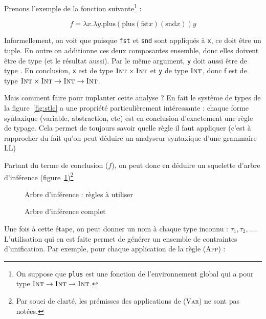 Prenons l'exemple de la fonction suivante\footnote{ On suppose que \texttt{plus}
est une fonction de l'environnement global qui a pour type $\textsc{Int} \rightarrow
\textsc{Int} \rightarrow \textsc{Int}$.} :

\[
f = λx.λy. \textrm{plus} (\textrm{plus} (\textrm{fst} x) (\textrm{snd} x)) y
\]

Informellement, on voit que puisque \texttt{fst} et \texttt{snd} sont appliqués
à \texttt{x}, ce doit être un tuple. En outre on additionne ces deux composantes
ensemble, donc elles doivent être de type \tInt (et le résultat aussi). Par le
même argument, \texttt{y} doit aussi être de type \tInt. En conclusion,
\texttt{x} est de type $\textsc{Int} \times \textsc{Int}$ et \texttt{y} de type $\textsc{Int}$, donc
f est de type $\textsc{Int} \times \textsc{Int} \rightarrow \textsc{Int} \rightarrow \textsc{Int}$.

Mais comment faire pour implanter cette analyse ? En fait le système de types de
la figure~\ref{fig:stlc} a une propriété particulièrement intéressante : chaque
forme syntaxique (variable, abstraction, etc) est en conclusion d'exactement une
règle de typage. Cela permet de toujours savoir quelle règle il faut appliquer
(c'est à rapprocher du fait qu'on peut déduire un analyseur syntaxique d'une
grammaire LL)

Partant du terme de conclusion ($f$), on peut donc en déduire un squelette
d'arbre d'inférence (figure~\ref{fig:inftree-rules})\footnote{Par souci de
clarté, les prémisses des applications de \textsc{(Var)} ne sont pas notées.}

\begin{figure} %
\def\disptypeL#1{}
\def\disptypeR#1{}



\caption{Arbre d'inférence : règles à utiliser}
\label{fig:inftree-rules}
\end{figure} %

\begin{figure} %
\def\disptypeL#1{:#1}
\def\disptypeR#1{:#1}



\caption{Arbre d'inférence complet}
\label{fig:inftree-full}
\end{figure} %

Une fois à cette étape, on peut donner un nom à chaque type inconnu : $τ_1, τ_2,
\ldots$. L'utilisation qui en est faite permet de générer un ensemble de
contraintes d'unification. Par exemple, pour chaque application de la règle
\textsc{(App)} :

